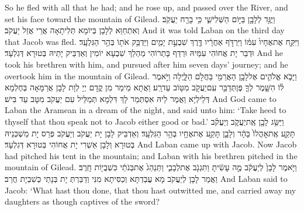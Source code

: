 {So he fled with all that he had; and he rose up, and passed over the River, and set his face toward the mountain of Gilead.}{}
{וַיֻּגַּ֥ד לְלָבָ֖ן בַּיּ֣וֹם הַשְּׁלִישִׁ֑י כִּ֥י בָרַ֖ח יַעֲקֹֽב׃}
{וְאִתְחַוַּא לְלָבָן בְּיוֹמָא תְּלִיתָאָה אֲרֵי אֲזַל יַעֲקֹב׃}
{And it was told Laban on the third day that Jacob was fled.}{}
{וַיִּקַּ֤ח אֶת\maqqaf אֶחָיו֙ עִמּ֔וֹ וַיִּרְדֹּ֣ף אַחֲרָ֔יו דֶּ֖רֶךְ שִׁבְעַ֣ת יָמִ֑ים וַיַּדְבֵּ֥ק אֹת֖וֹ בְּהַ֥ר הַגִּלְעָֽד׃}
{וּדְבַר יָת אֲחוֹהִי עִמֵּיהּ וּרְדַף בָּתְרוֹהִי מַהְלַךְ שִׁבְעָא יוֹמִין וְאַדְבֵּיק יָתֵיהּ בְּטוּרָא דְּגִלְעָד׃}
{And he took his brethren with him, and pursued after him seven days’ journey; and he overtook him in the mountain of Gilead.}{}
{וַיָּבֹ֧א אֱלֹהִ֛ים אֶל\maqqaf לָבָ֥ן הָאֲרַמִּ֖י בַּחֲלֹ֣ם הַלָּ֑יְלָה וַיֹּ֣אמֶר ל֗וֹ הִשָּׁ֧מֶר לְךָ֛ פֶּן\maqqaf תְּדַבֵּ֥ר עִֽם\maqqaf יַעֲקֹ֖ב מִטּ֥וֹב עַד\maqqaf רָֽע׃}
{וַאֲתָא מֵימַר מִן קֳדָם יְיָ לְוָת לָבָן אֲרַמָּאָה בְּחֶלְמָא דְּלֵילְיָא וַאֲמַר לֵיהּ אִסְתְּמַר לָךְ דִּלְמָא תְּמַלֵּיל עִם יַעֲקֹב מִטָּב עַד בִּישׁ׃}
{And God came to Laban the Aramean in a dream of the night, and said unto him: ‘Take heed to thyself that thou speak not to Jacob either good or bad.’}{}
{וַיַּשֵּׂ֥ג לָבָ֖ן אֶֽת\maqqaf יַעֲקֹ֑ב וְיַעֲקֹ֗ב תָּקַ֤ע אֶֽת\maqqaf אׇהֳלוֹ֙ בָּהָ֔ר וְלָבָ֛ן תָּקַ֥ע אֶת\maqqaf אֶחָ֖יו בְּהַ֥ר הַגִּלְעָֽד׃}
{וְאַדְבֵּיק לָבָן יָת יַעֲקֹב וְיַעֲקֹב פְּרַס יָת מַשְׁכְּנֵיהּ בְּטוּרָא וְלָבָן אַשְׁרִי יָת אֲחוֹהִי בְּטוּרָא דְּגִלְעָד׃}
{And Laban came up with Jacob. Now Jacob had pitched his tent in the mountain; and Laban with his brethren pitched in the mountain of Gilead.}{}
{וַיֹּ֤אמֶר לָבָן֙ לְיַעֲקֹ֔ב מֶ֣ה עָשִׂ֔יתָ וַתִּגְנֹ֖ב אֶת\maqqaf לְבָבִ֑י וַתְּנַהֵג֙ אֶת\maqqaf בְּנֹתַ֔י כִּשְׁבֻי֖וֹת חָֽרֶב׃}
{וַאֲמַר לָבָן לְיַעֲקֹב מָא עֲבַדְתָּא וְכַסִּיתָא מִנִּי וְדַבַּרְתְּ יָת בְּנָתַי כְּשִׁבְיָת חֲרַב׃}
{And Laban said to Jacob: ‘What hast thou done, that thou hast outwitted me, and carried away my daughters as though captives of the sword?}{}
